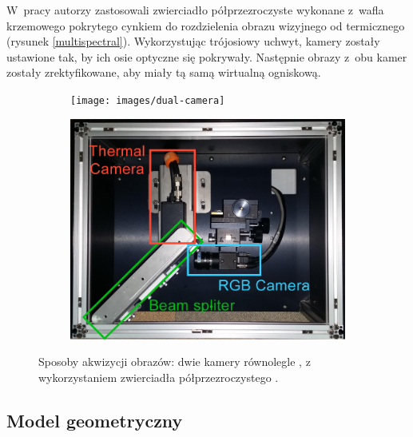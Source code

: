 W~pracy \cite{hwang2015multispectral} autorzy zastosowali zwierciadło półprzezroczyste wykonane z~wafla krzemowego pokrytego cynkiem do rozdzielenia obrazu wizyjnego od termicznego (rysunek \ref{multispectral}). 
Wykorzystując trójosiowy uchwyt, kamery zostały ustawione tak, by ich osie optyczne się pokrywały. 
Następnie obrazy z~obu kamer zostały zrektyfikowane, aby miały tą samą wirtualną ogniskową.

\begin{figure}[h]
\centering
\begin{subfigure}{0.45\textwidth}
\centering
\texttt{[image: images/dual-camera]}
\subcaption{\label{dual_camera}}
\end{subfigure}
\begin{subfigure}{0.45\textwidth}
\centering
\includegraphics[width=1\textwidth]{images/multispectral}
\subcaption{\label{multispectral}}
\end{subfigure}
\caption{\label{fig:cameras_systems}Sposoby akwizycji obrazów: \protect{} dwie kamery równolegle \cite{lee2015robust}, \protect{} z wykorzystaniem zwierciadła półprzezroczystego \cite{hwang2015multispectral}.}
\end{figure}


\subsection{Model geometryczny}


